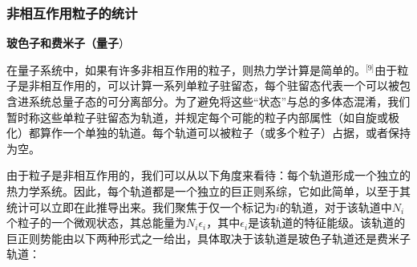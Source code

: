 \subsubsection{非相互作用粒子的统计}

\textbf{玻色子和费米子（量子}）

在量子系统中，如果有许多非相互作用的粒子，则热力学计算是简单的。\(^\text{[9]}\)由于粒子是非相互作用的，可以计算一系列单粒子驻留态，每个驻留态代表一个可以被包含进系统总量子态的可分离部分。为了避免将这些“状态”与总的多体态混淆，我们暂时称这些单粒子驻留态为轨道，并规定每个可能的粒子内部属性（如自旋或极化）都算作一个单独的轨道。每个轨道可以被粒子（或多个粒子）占据，或者保持为空。

由于粒子是非相互作用的，我们可以从以下角度来看待：每个轨道形成一个独立的热力学系统。因此，每个轨道都是一个独立的巨正则系综，它如此简单，以至于其统计可以立即在此推导出来。我们聚焦于仅一个标记为\(i\)的轨道，对于该轨道中\(N_i\)个粒子的一个微观状态，其总能量为\(N_i\epsilon_i\)，其中\(\epsilon_i\)是该轨道的特征能级。该轨道的巨正则势能由以下两种形式之一给出，具体取决于该轨道是玻色子轨道还是费米子轨道：


